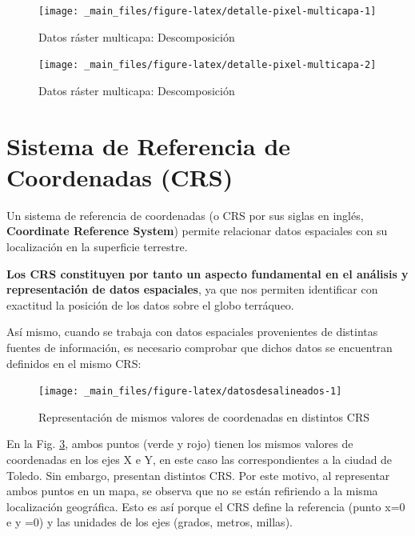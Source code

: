 \documentclass[
]{report}
\begin{document}
\begin{figure}

{\centering \texttt{[image: \_main\_files/figure-latex/detalle-pixel-multicapa-1]} 

}

\caption{Datos ráster multicapa: Descomposición}\label{fig:detalle-pixel-multicapa-1}
\end{figure}
\begin{figure}

{\centering \texttt{[image: \_main\_files/figure-latex/detalle-pixel-multicapa-2]} 

}

\caption{Datos ráster multicapa: Descomposición}\label{fig:detalle-pixel-multicapa-2}
\end{figure}

\hypertarget{CRS}{%
\section{Sistema de Referencia de Coordenadas (CRS)}\label{CRS}}

Un sistema de referencia de coordenadas (o CRS por sus siglas en inglés,
\textbf{Coordinate Reference System}) permite relacionar datos espaciales con su
localización en la superficie terrestre.

\textbf{Los CRS constituyen por tanto un aspecto fundamental en el análisis y
representación de datos espaciales}, ya que nos permiten identificar con
exactitud la posición de los datos sobre el globo terráqueo.

Así mismo, cuando se trabaja con datos espaciales provenientes de distintas
fuentes de información, es necesario comprobar que dichos datos se encuentran
definidos en el mismo CRS:

\begin{figure}

{\centering \texttt{[image: \_main\_files/figure-latex/datosdesalineados-1]} 

}

\caption{Representación de mismos valores de coordenadas en distintos CRS}\label{fig:datosdesalineados}
\end{figure}

En la Fig. \ref{fig:datosdesalineados}, ambos puntos (verde y rojo) tienen los
mismos valores de coordenadas en los ejes X e Y, en este caso las
correspondientes a la ciudad de Toledo. Sin embargo, presentan distintos CRS.
Por este motivo, al representar ambos puntos en un mapa, se observa que no se
están refiriendo a la misma localización geográfica. Esto es así porque el CRS
define la referencia (punto x=0 e y =0) y las unidades de los ejes (grados,
metros, millas).
\end{document}
